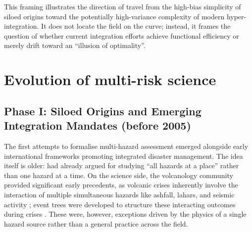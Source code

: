 \documentclass[12pt]{article}
\begin{document}
This framing illustrates the direction of travel from the high-bias simplicity of siloed origins toward the potentially high-variance complexity of modern hyper-integration. It does not locate the field on the curve; instead, it frames the question of whether current integration efforts achieve functional efficiency or merely drift toward an ``illusion of optimality''.

\section{Evolution of multi-risk science}

\subsection{Phase I: Siloed Origins and Emerging Integration Mandates (before 2005)}
The first attempts to formalise multi-hazard assessment emerged alongside early international frameworks promoting integrated disaster management. The idea itself is older: \citet{hewitt1971hazardousness} had already argued for studying ``all hazards at a place'' rather than one hazard at a time. On the science side, the volcanology community provided significant early precedents, as volcanic crises inherently involve the interaction of multiple simultaneous hazards like ashfall, lahars, and seismic activity \citep{tilling1989volcanic, blong1996volcanic}; event trees were developed to structure these interacting outcomes during crises \citep{newhall2002constructing}. These were, however, exceptions driven by the physics of a single hazard source rather than a general practice across the field.
\end{document}
